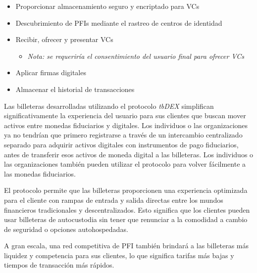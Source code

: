 \documentclass[11pt]{article}
\begin{document}
\begin{itemize}
	\item Proporcionar almacenamiento seguro y encriptado para VCs

	\item Descubrimiento de PFIs mediante el rastreo de centros de identidad

	\item Recibir, ofrecer y presentar VCs

\begin{itemize}
	\item \textit{Nota: se requeriría el consentimiento del usuario final para ofrecer VCs}

\end{itemize}
	\item Aplicar firmas digitales

	\item Almacenar el historial de transacciones

\vspace{1\baselineskip}
\end{itemize}
Las billeteras desarrolladas utilizando el protocolo \textit{tbDEX} simplifican significativamente la experiencia del usuario para sus clientes que buscan mover activos entre monedas fiduciarios y digitales. Los individuos o las organizaciones ya no tendrían que primero registrarse a través de un intercambio centralizado separado para adquirir activos digitales con instrumentos de pago fiduciarios, antes de transferir esos activos de moneda digital a las billeteras. Los individuos o las organizaciones también pueden utilizar el protocolo para volver fácilmente a las monedas fiduciarios.

\vspace{1\baselineskip}
El protocolo permite que las billeteras proporcionen una experiencia optimizada para el cliente con rampas de entrada y salida directas entre los mundos financieros tradicionales y descentralizados. Esto significa que los clientes pueden usar billeteras de autocustodia sin tener que renunciar a la comodidad a cambio de seguridad o opciones autohospedadas.

\vspace{1\baselineskip}
A gran escala, una red competitiva de PFI también brindará a las billeteras más liquidez y competencia para sus clientes, lo que significa tarifas más bajas y tiempos de transacción más rápidos.
\end{document}
